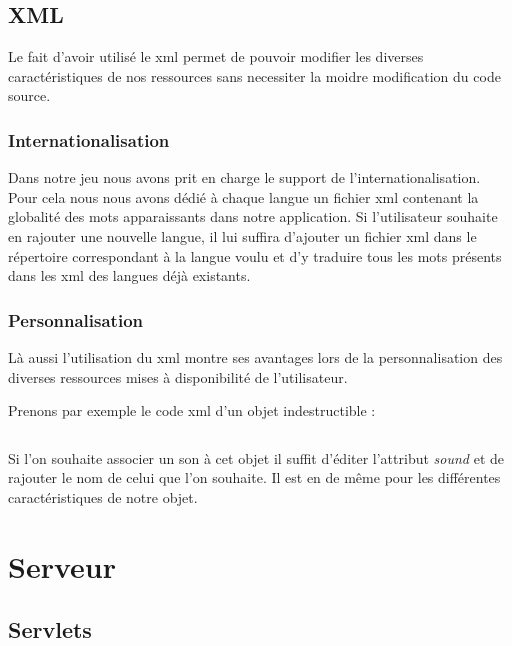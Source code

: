 			\begin{center}
			\end{center} 
		
	\subsection{XML}
	
		Le fait d'avoir utilisé le \gls{xml} permet de pouvoir modifier les diverses caractéristiques de nos
		ressources sans necessiter la moidre modification du code source.
	
		\subsubsection{Internationalisation}
		
			Dans notre jeu nous avons prit en charge le support de l'internationalisation.
			Pour cela nous nous avons dédié à chaque langue un fichier \gls{xml} contenant
			la globalité des mots apparaissants dans notre application.
			Si l'utilisateur souhaite en rajouter une nouvelle langue, il lui suffira d'ajouter
			un fichier \gls{xml} dans le répertoire correspondant à la langue voulu et d'y traduire
			tous les mots présents dans les \gls{xml} des langues déjà existants.
	
		\subsubsection{Personnalisation}
	
			Là aussi l'utilisation du \gls{xml} montre ses avantages lors de la personnalisation
			des diverses ressources mises à disponibilité de l'utilisateur.
			
			Prenons par exemple le code \gls{xml} d'un objet indestructible :
			
			$\,$
		
			\begin{footnotesize}
			\end{footnotesize}
			
			Si l'on souhaite associer un son à cet objet il suffit d'éditer l'attribut \emph{sound}
			et de rajouter le nom de celui que l'on souhaite.
			Il est en de même pour les différentes caractéristiques de notre objet.		

\section{Serveur}

	\subsection{Servlets}
